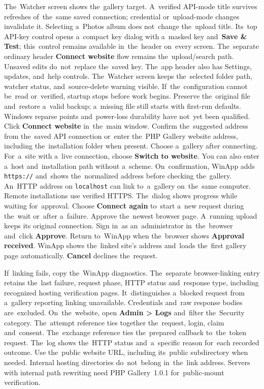 \documentclass[11pt,a4paper]{article}
\newcommand{\ui}[1]{\textbf{#1}}
\begin{document}
The~Watcher screen shows the~gallery target. A~verified API-mode title survives
refreshes of~the~same saved connection; credential or~upload-mode changes
invalidate it. Selecting a~Photos album does not~change the~upload title.
Its~top API-key control opens
a~compact key dialog with a~masked key and~\ui{Save \& Test}; this~control
remains available in~the~header on~every screen. The~separate ordinary header
\ui{Connect website} flow remains the~upload/search path. Unsaved edits do~not~replace
the~saved key. The~app header also has Settings,
updates, and~help controls. The~Watcher screen keeps the~selected folder path,
watcher status, and~source-delete warning visible.
If~the~configuration cannot be~read or~verified, startup stops before work
begins. Preserve the~original file and~restore a~valid backup; a~missing file
still starts with first-run defaults. Windows reparse points and~power-loss
durability have not~yet been qualified.
Click \ui{Connect website} in~the~main window. Confirm the~suggested address
from the~saved API connection or~enter the~PHP Gallery website address,
including the~installation folder when present. Choose a~gallery after connecting.
For~a~site with a~live connection, choose \ui{Switch to website}.
You can also enter a~host and~installation path without a~scheme.
On~confirmation, WinApp adds \texttt{https://} and~shows the~normalized
address before checking the~gallery.
An~HTTP address on \texttt{localhost} can link to~a~gallery on~the~same
computer. Remote installations use verified HTTPS.
The~dialog shows progress while waiting for~approval. Choose \ui{Connect again}
to~start a~new request during the~wait or~after a~failure. Approve the~newest
browser page. A~running upload keeps its original connection.
Sign in~as an~administrator in~the~browser and~click \ui{Approve}.
Return to~WinApp when the~browser shows \ui{Approval received}. WinApp
shows the~linked site's address and~loads the~first gallery page
automatically. \ui{Cancel} declines the~request.

If~linking fails, copy the~WinApp diagnostics. The~separate browser-linking
entry retains the~last failure, request phase, HTTP status and~response type,
including recognized hosting verification pages. It~distinguishes a~blocked
request from a~gallery reporting linking unavailable. Credentials and~raw
response bodies are~excluded.
On~the~website, open \ui{Admin > Logs} and~filter the~Security category.
The~attempt reference ties together the~request, login, claim and~consent.
The~exchange reference ties the~prepared callback to~the~token request.
The~log shows the~HTTP status and~a~specific reason for~each recorded outcome.
Use the~public website URL, including its~public subdirectory when needed.
Internal hosting directories do~not~belong in~the~link address. Servers with
internal path rewriting need PHP Gallery~1.0.1 for~public-mount verification.
\end{document}
